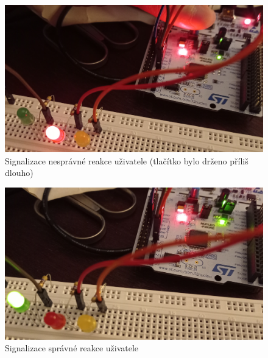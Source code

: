 \documentclass[twoside]{article}
\begin{document}
\begin{figure}[htbp]
    \centering
    \includegraphics[height=0.2\textheight]{bad.jpg}
    \caption{Signalizace nesprávné reakce uživatele (tlačítko bylo drženo příliš dlouho)}
    \label{fig:bad}
\end{figure}

\begin{figure}[htbp]
    \centering
    \includegraphics[height=0.2\textheight]{pochvala.jpg}
    \caption{Signalizace správné reakce uživatele}
    \label{fig:pochvala}
\end{figure}
\end{document}
